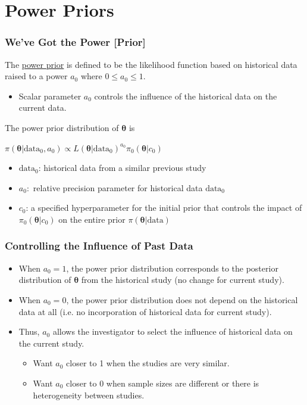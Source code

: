 \documentclass{beamer}
\begin{document}
\section{Power Priors}
\begin{frame}
\frametitle{We've Got the Power [Prior]}
The \underline{power prior} is defined to be the likelihood function based on historical data raised to a power $a_{0}$ where $0 \leq a_0 \leq 1$. 
\begin{itemize}
\item Scalar parameter $a_0$ controls the influence of the historical data on the current data.  
\end{itemize}
The power prior distribution of $\pmb{\theta}$ is 
\begin{center}
$\pi(\pmb{\theta}|\text{data}_0, a_0) \propto L(\pmb{\theta}|\text{data}_0)^{a_0}\pi_0(\pmb{\theta}|c_{0})$
\end{center}
\begin{itemize}
\item $\text{data}_0$: historical data from a similar previous study 
\item $a_0:$ relative precision parameter for historical data $\text{data}_0$
\item $c_0$: a specified hyperparameter for the initial prior that controls the impact of $\pi_0(\pmb{\theta}|c_{0})$ on the entire prior $\pi(\pmb{\theta}|\text{data})$
\end{itemize}
\end{frame}

\begin{frame}
\frametitle{Controlling the Influence of Past Data}
\begin{itemize}
\item When \color{orange}$a_0 = 1$\color{black}, the power prior distribution corresponds to the posterior distribution of $\pmb{\theta}$ from the historical study (no change for current study).
\item When \color{orange}$a_0 = 0$\color{black}, the power prior distribution does not depend on the historical data at all (i.e. no incorporation of historical data for current study). 
\item Thus, $a_0$ allows the investigator to select the influence of historical data on the current study. 
	\begin{itemize}
	\item Want $a_0$ closer to 1 when the studies are very similar. 
	\item Want $a_0$ closer to 0 when sample sizes are different or there is heterogeneity between studies. 
	\end{itemize} 
\end{itemize}
\end{frame}
\end{document}
